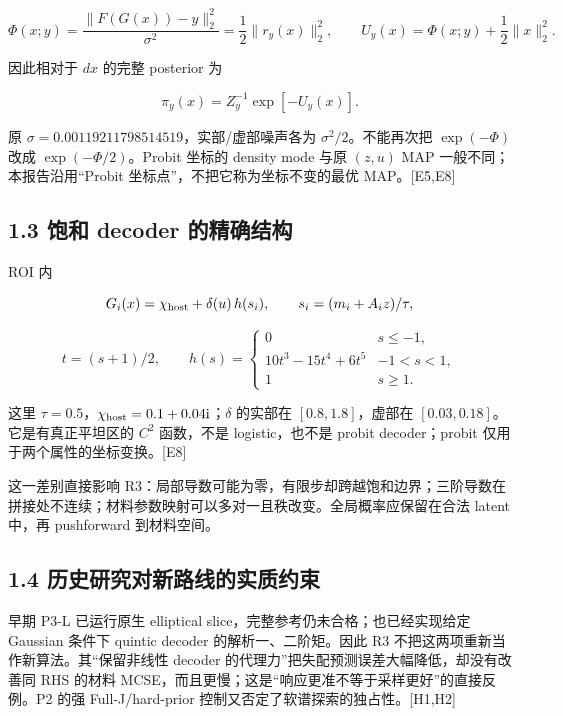 \documentclass[
  11pt,
  a4paper,
]{article}
\begin{document}
\[\Phi(x;y)=\frac{\|F(G(x))-y\|_2^2}{\sigma^2}=\frac12\|r_y(x)\|_2^2,
\qquad U_y(x)=\Phi(x;y)+\frac12\|x\|_2^2.\]

因此相对于 \(dx\) 的完整 posterior 为

\[\pi_y(x)=Z_y^{-1}\exp[-U_y(x)].\]

原 \(\sigma=0.00119211798514519\)，实部/虚部噪声各为
\(\sigma^2/2\)。不能再次把 \(\exp(-\Phi)\) 改成
\(\exp(-\Phi/2)\)。Probit 坐标的 density mode 与原 \((z,u)\) MAP
一般不同；本报告沿用``Probit 坐标点''，不把它称为坐标不变的最优
MAP。{[}E5,E8{]}

\hypertarget{ux9971ux548c-decoder-ux7684ux7cbeux786eux7ed3ux6784}{%
\subsection{1.3 饱和 decoder
的精确结构}\label{ux9971ux548c-decoder-ux7684ux7cbeux786eux7ed3ux6784}}

ROI 内

\[G_i(x)=\chi_{\rm host}+\delta(u)\,h(s_i),\qquad
s_i=(m_i+A_i z)/\tau,\]

\[t=(s+1)/2,\qquad
h(s)=\begin{cases}0&s\le-1,\\10t^3-15t^4+6t^5&-1<s<1,\\1&s\ge1.\end{cases}\]

这里 \(\tau=0.5\)，\(\chi_{\rm host}=0.1+0.04\mathrm{i}\)；\(\delta\)
的实部在 \([0.8,1.8]\)，虚部在 \([0.03,0.18]\)。它是有真正平坦区的
\(C^2\) 函数，不是 logistic，也不是 probit decoder；probit
仅用于两个属性的坐标变换。{[}E8{]}

这一差别直接影响
R3：局部导数可能为零，有限步却跨越饱和边界；三阶导数在拼接处不连续；材料参数映射可以多对一且秩改变。全局概率应保留在合法
latent 中，再 pushforward 到材料空间。

\hypertarget{ux5386ux53f2ux7814ux7a76ux5bf9ux65b0ux8defux7ebfux7684ux5b9eux8d28ux7ea6ux675f}{%
\subsection{1.4
历史研究对新路线的实质约束}\label{ux5386ux53f2ux7814ux7a76ux5bf9ux65b0ux8defux7ebfux7684ux5b9eux8d28ux7ea6ux675f}}

早期 P3-L 已运行原生 elliptical slice，完整参考仍未合格；也已经实现给定
Gaussian 条件下 quintic decoder 的解析一、二阶矩。因此 R3
不把这两项重新当作新算法。其``保留非线性 decoder
的代理力''把失配预测误差大幅降低，却没有改善同 RHS 的材料
MCSE，而且更慢；这是``响应更准不等于采样更好''的直接反例。P2 的强
Full-J/hard-prior 控制又否定了软谱探索的独占性。{[}H1,H2{]}
\end{document}
